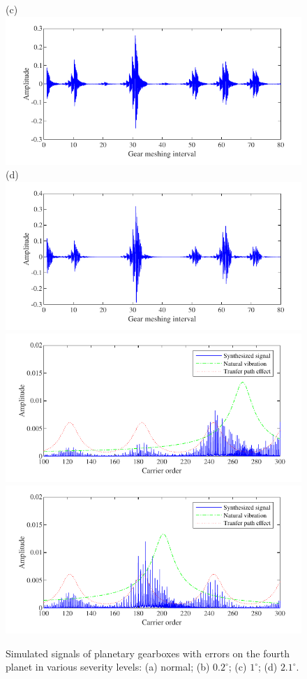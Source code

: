 \documentclass[a4paper,fleqn]{cas-sc}%
\begin{document}
\begin{figure}[pos=htbp]
    (c) \includegraphics[scale=\myscale,valign=t]{Time_p6_medium_error.pdf}
    (d) \includegraphics[scale=\myscale,valign=t]{Time_p6_severe_error.pdf}\\
    \hspace*{1.5em}\includegraphics[scale=\myscale,valign=t]{Freq_p6_medium_error.pdf}
    \hspace*{1.5em}\includegraphics[scale=\myscale,valign=t]{Freq_p6_severe_error.pdf}
    \caption{Simulated signals of planetary gearboxes with errors on the fourth planet in various severity levels: (a) normal; (b) $0.2^\circ$; (c) $1^\circ$; (d) $2.1^\circ$.}
    \label{fig:simulated_p6_severity}
\end{figure}
\end{document}
